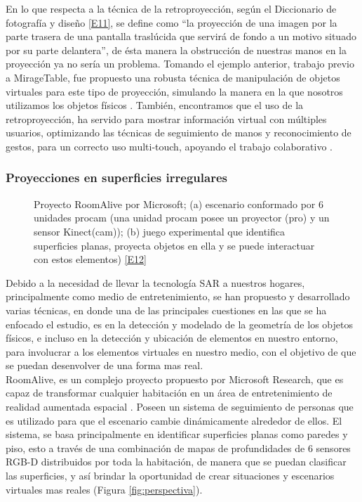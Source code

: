 \documentclass[a4paper,openright,12pt]{report}
\begin{document}
En lo que respecta a la técnica de la retroproyección, según el Diccionario de fotografía y diseño \hyperlink{e11}{[E11]}, se define como ``la proyección de una imagen por la parte trasera de una pantalla traslúcida que servirá de fondo a un motivo situado por su parte delantera'', de ésta manera la obstrucción de nuestras manos en la proyección ya no sería un problema. Tomando el ejemplo anterior, trabajo previo a MirageTable, fue propuesto una robusta técnica de manipulación de objetos virtuales para este tipo de proyección, simulando la manera en la que nosotros utilizamos los objetos físicos \citep{hilliges2009}. También, encontramos que el uso de la retroproyección, ha servido para mostrar información virtual con múltiples usuarios, optimizando las técnicas de seguimiento de manos y reconocimiento de gestos, para un correcto uso multi-touch, apoyando el trabajo colaborativo \citep[ejemplos de retroproyección]{geller2006,dohse2008}.
\subsubsection{Proyecciones en superficies irregulares}
\begin{figure}[th]
	\centering
	\caption[Proyecto RoomAlive por Microsoft\textregistered]{Proyecto RoomAlive por Microsoft\textregistered; (a) escenario conformado por 6 unidades procam (una unidad procam posee un proyector (pro) y un sensor Kinect\textcopyright(cam)); (b) juego experimental que identifica superficies planas, proyecta objetos en ella y se puede interactuar con estos elementos) \hyperlink{e12}{[E12]}} \label{fig:roomalive}
\end{figure}
Debido a la necesidad de llevar la tecnología SAR a nuestros hogares, principalmente como medio de entretenimiento, se han propuesto y desarrollado varias técnicas, en donde una de las principales cuestiones en las que se ha enfocado el estudio, es en la detección y modelado de la geometría de los objetos físicos, e incluso en la detección y ubicación de elementos en nuestro entorno, para involucrar a los elementos virtuales en nuestro medio, con el objetivo de que se puedan desenvolver de una forma mas real.\\
RoomAlive, es un complejo proyecto propuesto por Microsoft Research\textregistered, que es capaz de transformar cualquier habitación en un área de entretenimiento de realidad aumentada espacial \cite{jones2014}. Poseen un sistema de seguimiento de personas que es utilizado para que el escenario cambie dinámicamente alrededor de ellos. El sistema, se basa principalmente en identificar superficies planas como paredes y piso, esto a través de una combinación de mapas de profundidades de 6 sensores RGB-D distribuidos por toda la habitación, de manera que se puedan clasificar las superficies, y así brindar la oportunidad de crear situaciones y escenarios virtuales mas reales (Figura \ref{fig:perspectiva}).
\end{document}
